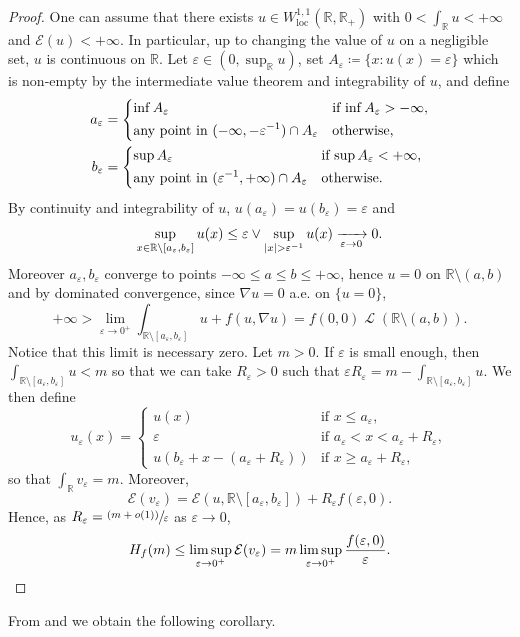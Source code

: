 \documentclass[10pt]{amsart}
\newcommand{\psfrac}[2]{{\sfrac{(#1)}{#2}}}
\theoremstyle{plain}
\theoremstyle{definition}
\newcommand{\R}{\mathbb{R}}
\newcommand{\ener}{\mathcal{E}}
\newcommand{\loc}{\mathrm{loc}}
\newcommand{\eps}{\varepsilon}
\DeclarePairedDelimiter{\abs}{\lvert}{\rvert}
\DeclareMathOperator{\lbm}{\mathcal{L}}
\newcommand{\xto}[2][]{\xrightarrow[#2]{#1}}
\begin{document}
\begin{proof}
One can assume that there exists \(u\in W^{1,1}_\loc(\R,\R_+)\) with \(0<\int_\R u<+\infty\) and \(\ener(u)<+\infty\). In particular, up to changing the value of \(u\) on a negligible set, \(u\) is continuous on \(\R\). Let \(\eps\in(0,\sup_\R u)\), set $A_\eps \coloneqq \{x : u(x) = \eps\}$ which is non-empty by the intermediate value theorem and integrability of $u$, and define
\begin{align*}
a_\eps &= \begin{dcases*}
\inf A_\eps & if $\inf A_\eps >-\infty$,\\
\text{any point in } (-\infty,-\eps^{-1}) \cap A_\eps & otherwise,
\end{dcases*}\\
b_\eps &=\begin{dcases*}
\sup A_\eps & if $\sup A_\eps <+\infty$,\\
\text{any point in } (\eps^{-1},+\infty) \cap A_\eps & otherwise.
\end{dcases*}
\end{align*}
By continuity and integrability of $u$, \(u(a_\eps) = u(b_\eps) =\eps\) and
\[\sup_{x\in\R\setminus [a_\eps,b_\eps]} u(x) \leq \eps \vee \sup_{\abs{x}> \eps^{-1}} u(x) \xto{\eps \to 0} 0.\]
Moreover $a_\eps,b_\eps$ converge to points $-\infty\leq a \leq b \leq +\infty$, hence $u = 0$ on $\R\setminus(a,b)$ and by dominated convergence, since \(\nabla u=0\) a.e. on \(\{u=0\}\),
\[
+\infty > \lim_{\eps\to 0^+}\int_{\R\setminus [a_\eps,b_\eps]}u+f(u,\nabla u) = f(0,0)\lbm(\R\setminus(a,b)).
\]
Notice that this limit is necessary zero. Let \(m>0\). If \(\eps\) is small enough, then \(\int_{\R\setminus [a_\eps,b_\eps]} u<m\) so that we can take \(R_\eps>0\) such that \(\eps R_\eps=m- \int_{\R\setminus [a_\eps,b_\eps]} u\). We then define
\[
u_\eps(x)=
\begin{cases}
u(x)&\text{if \(x\leq a_\eps\),}\\
\eps&\text{if \(a_\eps< x< a_\eps+R_\eps\)},\\
u(b_\eps+x-(a_\eps+R_\eps))&\text{if \(x\geq a_\eps+R_\eps\),}
\end{cases}
\]
so that \(\int_\R v_\eps=m\). Moreover,
\[
\ener(v_\eps)=\ener(u,\R\setminus [a_\eps,b_\eps])+R_\eps f(\eps,0).
\]
Hence, as \(R_\eps=\psfrac{m+o(1)}{\eps}\) as \(\eps\to 0\),
\[
H_f(m)\leq \limsup_{\eps\to 0^+}\ener(v_\eps)
= m\limsup_{\eps\to 0^+}\frac{f(\eps,0)}{\eps}.\qedhere
\]
\end{proof}

From  and  we obtain the following corollary.
\end{document}
